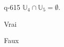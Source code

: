 \begin{truefalse}{q-615}
$\mathbb U_4 \cap  \mathbb U_5=\emptyset$.
\item Vrai
\item* Faux
\end{truefalse}

